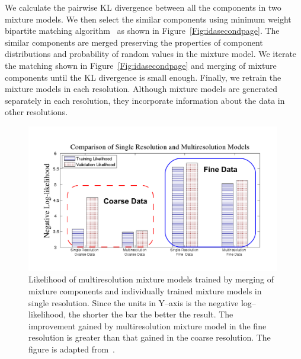 We calculate the  pairwise KL divergence between 
all the components in two mixture models. We then  
select the similar components using minimum weight 
bipartite matching algorithm~\cite{west96graph} as shown in 
Figure~\ref{Fig:idasecondpage}. The similar components  are 
merged preserving the properties of component distributions 
and probability of random values in the mixture model. 
We iterate the matching shown in Figure~\ref{Fig:idasecondpage} 
and merging of mixture components until the  KL divergence is 
small enough. Finally, we retrain the mixture models in each 
resolution. Although mixture models are generated separately 
in each resolution, they incorporate information about the 
data in other resolutions.


\begin{figure}[h!]
\centering
\includegraphics[trim=10mm 10mm 10mm 2mm,width=0.99\textwidth]{figures/nbarlkhood}
\caption[Performance of Mixture Models in Coarse and Fine Resolution.]
{Likelihood of multiresolution mixture models trained by merging of mixture 
components and individually trained mixture models in single resolution. 
Since the units in Y--axis is the negative log--likelihood, the shorter the 
bar the better the result. The improvement gained by multiresolution mixture 
model in the fine resolution is greater than that gained in the coarse 
resolution. The figure is adapted from~.} 
\label{Fig:barlikelihood}
\end{figure}

